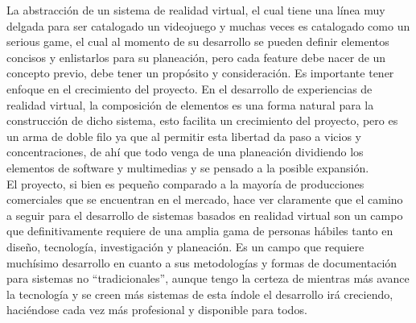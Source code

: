 La abstracción de un sistema de realidad virtual, el cual tiene una línea muy delgada para ser catalogado un videojuego y muchas veces es catalogado como un serious game, el cual al momento de su desarrollo se pueden definir elementos concisos y enlistarlos para su planeación, pero cada feature debe nacer de un concepto previo, debe tener un propósito y consideración. Es importante tener enfoque en el crecimiento del proyecto. En el desarrollo de experiencias de realidad virtual, la composición de elementos es una forma natural para la construcción de dicho sistema, esto facilita un crecimiento del proyecto, pero es un arma de doble filo ya que al permitir esta libertad da paso a vicios y concentraciones, de ahí que todo venga de una planeación dividiendo los elementos de software y multimedias y se pensado a la posible expansión.\\

El proyecto, si bien es pequeño comparado a la mayoría de producciones comerciales que se encuentran en el mercado, hace ver claramente que el camino a seguir para el desarrollo de sistemas basados en realidad virtual son un campo que definitivamente requiere de una amplia gama de personas hábiles tanto en diseño, tecnología, investigación y planeación. Es un campo que requiere muchísimo desarrollo en cuanto a sus metodologías y formas de documentación para sistemas no “tradicionales”, aunque tengo la certeza de mientras más avance la tecnología y se creen más sistemas de esta índole el desarrollo irá creciendo, haciéndose cada vez más profesional y disponible para todos.\\
